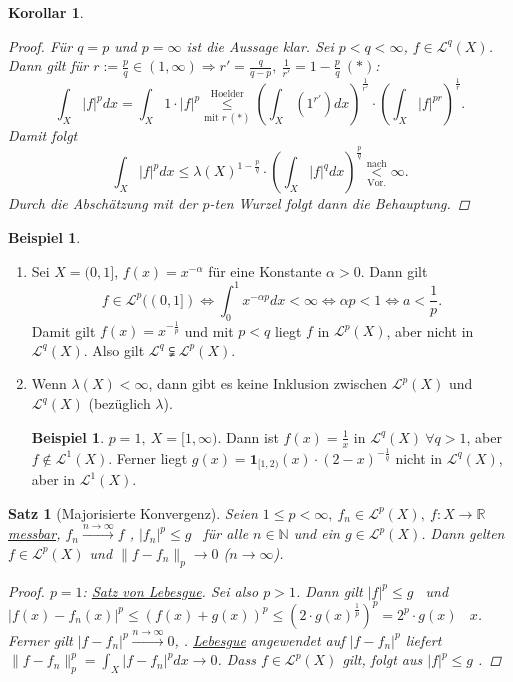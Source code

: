\documentclass[a4paper]{report}
\newcommand{\doubleOne}{\textbf{1}}
\newcommand{\R}{\mathbb{R}}
\newcommand{\N}{\mathbb{N}}
\newcommand{\Leb}{\mathcal{L}}
\newcommand{\overunderset}[3]{\overset{#1}{\underset{#3}{#2}}}
\newcommand{\jlabel}[1]{\label{j_#1}}
\newcommand{\jshortlink}[1]{\jhyperref{#1}{\text{#1}}}
\newcommand{\jhyperref}[2]{\hyperref[j_#1]{#2}}
\newcommand{\jlink}[1]{\jhyperref{#1}{#1}}
\newcommand{\fu}{\text{\textit{(f.ü.)}}}
\newcommand{\fa}{\text{\textit{(f.a.)}}}
\newcommand{\jabb}[3]{ #1: #2 \rightarrow #3 }
\theoremstyle{plain}
\newtheorem{satz}[thm]{Satz}
\newtheorem{kor}[thm]{Korollar}
\theoremstyle{definition}
\newtheorem{expl}[thm]{Beispiel}
\newtheorem*{expl*}{Beispiel}
\begin{document}
{{{{\begin{kor}
    \begin{proof}
        Für $q=p$ und $p=\infty$ ist die Aussage klar. Sei $p<q<\infty$, $f\in \Leb^q(X)$. Dann gilt für $r:=\frac{p}{q}\in (1,\infty) \Rightarrow r' = \frac{q}{q-p},\ \frac{1}{r'} = 1-\frac{p}{q}\ (*)$:
        \[
            \int_X |f|^p dx = \int_X 1\cdot |f|^p \overunderset{\jshortlink{Hoelder}}{\le}{\text{mit }r\ (*)} \left(\int_X \left(1^{r'} \right) dx \right)^\frac{1}{r'} \cdot \left(\int_X |f|^{pr} \right)^\frac{1}{r}.
        \]
        Damit folgt
        \[
            \int_X |f|^p dx \le \lambda(X)^{1-\frac{p}{q}} \cdot \left(\int_X |f|^q dx \right)^\frac{p}{q} \overunderset{\text{nach}}{<}{\text{Vor.}} \infty.
        \]
        Durch die Abschätzung mit der $p$-ten Wurzel folgt dann die Behauptung.
    \end{proof}
\end{kor}


\jlabel{Bsp 5.4}
\begin{expl}
    \begin{enumerate}
        \item
            \jlabel{Bsp 5.4a)}
            Sei $X=(0,1]$, $f(x)= x^{-\alpha}$ für eine Konstante $\alpha >0$. Dann gilt
            \[
                f\in \Leb^p((0,1]) \Leftrightarrow \int_0^1 x^{-\alpha p}dx < \infty \Leftrightarrow \alpha p < 1 \Leftrightarrow a < \frac{1}{p}.
            \]
            Damit gilt $f(x)=x^{-\frac{1}{p}}$ und mit $p<q$ liegt $f$ in $\Leb^p(X)$, aber nicht in $\Leb^q(X)$. Also gilt $\Leb^q \subsetneqq \Leb^p(X)$.
            
        \item
            \jlabel{Bsp 5.4b)}
            Wenn $\lambda(X)<\infty$, dann gibt es keine Inklusion zwischen $\Leb^p(X)$ und $\Leb^q(X)$ (bezüglich $\lambda$).
            \begin{expl*}
                $p=1,\ X=[1,\infty)$. Dann ist $f(x)=\frac{1}{x}$ in $\Leb^q(X)\ \forall q > 1$, aber $f\notin \Leb^1(X)$. Ferner liegt $g(x)=\doubleOne_{[1,2)}(x)\cdot(2-x)^{-\frac{1}{q}}$ nicht in $\Leb^q(X)$, aber in $\Leb^1(X)$.
            \end{expl*}
    \end{enumerate}
\end{expl}

\begin{satz}[Majorisierte Konvergenz]
    \jlabel{Satz 5.5}
    Seien $1\le p <\infty,\ f_n \in \Leb^p(X),\ \jabb{f}{X}{\R}$ \jlink{messbar}, $f_n\xrightarrow{n\to\infty}f$ \fu, $|f_n|^p \le g$ \fu\ für alle $n\in\N$ und ein \uline{$g\in \Leb^p(X)$}. Dann gelten $f\in \Leb^p(X)$ und $\lVert f- f_n \rVert_p \to 0$ ($n\to \infty$).
    \begin{proof}
        $p=1$: \jhyperref{Thm 3.10}{Satz von Lebesgue}. Sei also $p>1$. Dann gilt $|f|^p \le g$ \fu\ und $|f(x)-f_n(x)|^p \le (f(x)+g(x))^p \le (2\cdot g(x)^\frac{1}{p})^p = 2^p\cdot g(x)$ \fa\ $x$. Ferner gilt $|f-f_n|^p \xrightarrow{n\to \infty} 0$, \fu. \jhyperref{Thm 3.10}{Lebesgue} angewendet auf $|f-f_n|^p$ liefert $\lVert f-f_n \rVert_p^p = \int_X |f-f_n|^p dx \to 0$. Dass $f\in \Leb^p(X)$ gilt, folgt aus $|f|^p \le g$ \fu.
    \end{proof}
\end{satz}

}}}}
\end{document}

